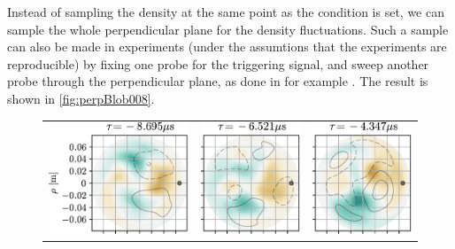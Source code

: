 Instead of sampling the density at the same point as the condition is set, we can sample the whole perpendicular plane for the density fluctuations.
Such a sample can also be made in experiments (under the assumtions that the experiments are reproducible) by fixing one probe for the triggering signal, and sweep another probe through the perpendicular plane, as done in for example \cite{Nielsen1996}.
The result is shown in \cref{fig:perpBlob008}.
%
\begin{figure}[h!]
\begin{tabular}{ccc}
  \includegraphics{fig/results/blobs/matrix-perp-blobs-B0_0.08-fluct/0} &
  \includegraphics{fig/results/blobs/matrix-perp-blobs-B0_0.08-fluct/1} &
  \includegraphics{fig/results/blobs/matrix-perp-blobs-B0_0.08-fluct/2} \\

\end{tabular}
\end{figure}
